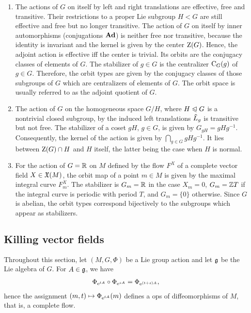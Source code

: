\begin{example}
\begin{enumerate}
    \item  The actions of $G$ on itself by left and right translations are effective, free and transitive. Their restrictions to a proper Lie subgroup $H< G$ are still effective and free but no longer transitive. The action of $G$ on itself by inner automorphisms (conjugations $\mathrm{\mathbf{Ad}}$) is neither free nor transitive, because the identity is invariant and the kernel is given by the center $\mathrm{Z}(G)$. Hence, the adjoint action is effective iff the center is trivial. Its orbits are the conjugacy classes of elements of $G$. The stabilizer of $g\in G$ is the centralizer  $\mathrm{C}_G(g)$ of $g\in G$. Therefore, the orbit types are given by the conjugacy classes of those subgroups of $G$ which are centralizers of elements of $G$. The orbit space is usually referred to as the adjoint quotient of $G$.
    \item The action of $G$ on the homogeneous space $G\slash H$, where $H\trianglelefteqslant G$ is a nontrivial closed subgroup, by the induced left translations $\wh{L}_g$ is transitive but not free. The stabilizer of a coset $gH$, $g\in G$, is given by $G_{gH}=gHg^{-1}$. Consequently, the kernel of the action is given by $\bigcap_{g\in G}gHg^{-1}$. It lies between $\mathrm{Z}(G)\cap H$ and $H$ itself, the latter being the case when $H$ is normal.
    \item For the action of $G=\mathbb{R}$ on $M$ defined by the flow $F^X$ of a complete vector field $X\in\mathfrak{X}(M)$, the orbit map of a point $m\in M$ is given by the maximal integral curve $F^X_m$. The stabilizer is $G_m=\mathbb{R}$ in the case $X_m=0$, $G_m=\mathbb{Z} T$ if the integral curve is periodic with period $T$, and $G_m=\{0\}$ otherwise. Since $G$ is abelian, the orbit types correspond bijectively to the subgroups which appear as stabilizers.
\end{enumerate}
\end{example}





\subsection{Killing vector fields}\label{sec Killing vectors}

Throughout this section, let $(M,G,\Phi)$ be a Lie group action and let $\mathfrak{g}$ be the Lie algebra of $G$. For $A\in \mathfrak{g}$, we have
\[\Phi_{\mathrm{e}^{tA}}\circ\Phi_{\mathrm{e}^{sA}}=\Phi_{\mathrm{e}^{(t+s)A}},\]
hence the assignment $(m,t)\mapsto \Phi_{\mathrm{e}^{tA}}(m)$ defines a \gls{ops} of diffeomorphisms of $M$, that is, a complete flow.

